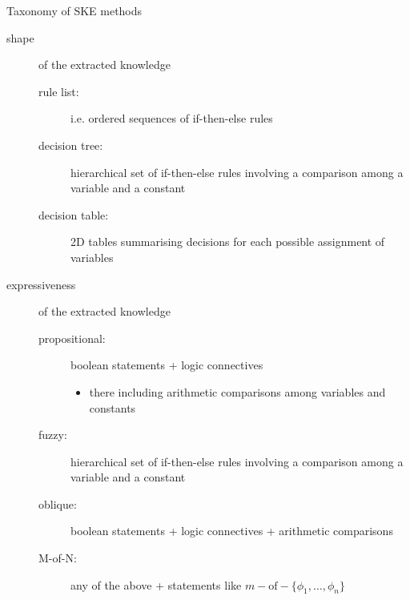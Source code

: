 \documentclass[presentation]{beamer}\mode<presentation>{\usetheme{AMSBolognaFC}}
\begin{document}
\begin{frame}[allowframebreaks]{Taxonomy of SKE methods}
\begin{description}
        \framebreak

        \item[shape] of the extracted knowledge
        \begin{description}
            \item[rule list:] i.e. ordered sequences of if-then-else rules
            \item[decision tree:] hierarchical set of if-then-else rules involving a comparison among a variable and a constant   
            \item[decision table:] 2D tables summarising decisions for each possible assignment of variables
        \end{description} 

        \framebreak

        \item[expressiveness] of the extracted knowledge
        \begin{description}
            \item[propositional:] boolean statements + logic connectives
            \begin{itemize}
                \item there including arithmetic comparisons among variables and constants
            \end{itemize}

            \item[fuzzy:] hierarchical set of if-then-else rules involving a comparison among a variable and a constant   
            \item[oblique:] boolean statements + logic connectives + arithmetic comparisons
            \item[M-of-N:] any of the above + statements like $m-\text{of}-\{\phi_1, \ldots, \phi_n \}$
        \end{description} 

    \end{description}
\end{frame}
\end{document}
